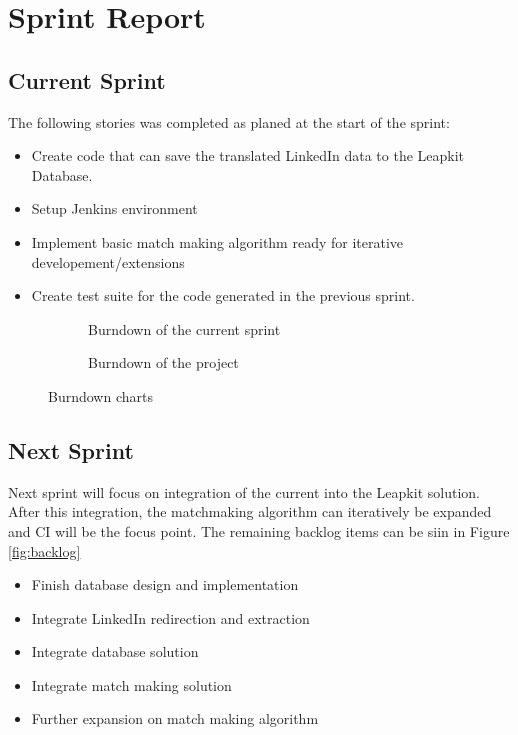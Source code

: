 \section{Sprint Report}

\subsection{Current Sprint}

The following stories was completed as planed at the start of the sprint:
\begin{itemize}
    \item Create code that can save the translated LinkedIn data to the Leapkit Database.
    \item Setup Jenkins environment
    \item Implement basic match making algorithm ready for iterative developement/extensions
    \item Create test suite for the code generated in the previous sprint.
\end{itemize}

\begin{figure}[!ht]
    \centering
    \begin{subfigure}[b]{0.5\textwidth}
        \scalebox{.6}{}
        \caption{Burndown of the current sprint}
        \label{fig:burndownSprint}
    \end{subfigure}%
    \begin{subfigure}[b]{0.5\textwidth}
        \scalebox{.7}{}
        \caption{Burndown of the project}
        \label{fig:burndownProject}
    \end{subfigure}
    \caption{Burndown charts}
\end{figure}

\subsection{Next Sprint}
Next sprint will focus on integration of the current into the Leapkit solution. After this integration, the matchmaking algorithm can iteratively be expanded and CI will be the focus point. The remaining backlog items can be siin in Figure \ref{fig:backlog}
\begin{itemize}
\item Finish database design and implementation
\item Integrate LinkedIn redirection and extraction
\item Integrate database solution
\item Integrate match making solution
\item Further expansion on match making algorithm
\end{itemize}

